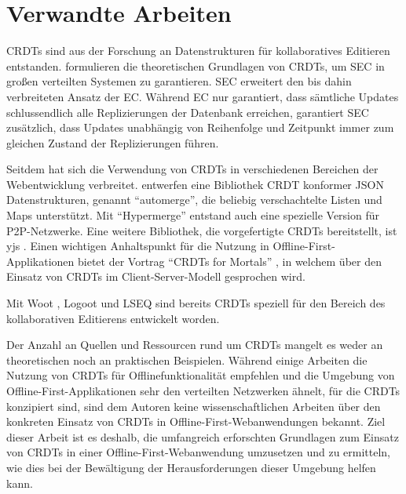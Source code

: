 \documentclass[a4paper, 12pt]{scrreprt}
\begin{document}
\section{Verwandte Arbeiten}
\label{sec:VerwandteArbeiten}

\acp{CRDT} sind aus der Forschung an Datenstrukturen für kollaboratives Editieren entstanden. \citet{InproceedingsCRDTOriginal} formulieren die theoretischen Grundlagen von \acp{CRDT}, um \ac{SEC} in großen verteilten Systemen zu garantieren. \ac{SEC} erweitert den bis dahin verbreiteten Ansatz der \ac{EC}. Während EC nur garantiert, dass sämtliche Updates schlussendlich alle Replizierungen der Datenbank erreichen, garantiert SEC zusätzlich, dass Updates unabhängig von Reihenfolge und Zeitpunkt immer zum gleichen Zustand der Replizierungen führen.

Seitdem hat sich die Verwendung von \acp{CRDT} in verschiedenen Bereichen der Webentwicklung verbreitet. \citet{ArticleCRDTJSON} entwerfen eine Bibliothek CRDT konformer \ac{JSON} Datenstrukturen, genannt \enquote{automerge}, die beliebig verschachtelte Listen und Maps unterstützt. Mit \enquote{Hypermerge} entstand auch eine spezielle Version für \ac{P2P}-Netzwerke. Eine weitere Bibliothek, die vorgefertigte \acp{CRDT} bereitstellt, ist yjs \autocite{inproceedingsYjs}. Einen wichtigen Anhaltspunkt für die Nutzung in Offline-First-Applikationen bietet der Vortrag \enquote{\acp{CRDT} for Mortals} \autocite{OnlineCrdtsForMortals}, in welchem über den Einsatz von \acp{CRDT} im Client-Server-Modell gesprochen wird.  

Mit Woot \autocite{InproceedingsCRDTWoot}, Logoot \autocite{InproceedingsCRDTLogoot} und LSEQ \autocite{InproceedingsCRDTLSEQ} sind bereits \acp{CRDT} speziell für den Bereich des kollaborativen Editierens entwickelt worden. 

Der Anzahl an Quellen und Ressourcen rund um \acp{CRDT} mangelt es weder an theoretischen noch an praktischen Beispielen. Während einige Arbeiten die Nutzung von \acp{CRDT} für Offlinefunktionalität empfehlen und die Umgebung von Offline-First-Applikationen sehr den verteilten Netzwerken ähnelt, für die \acp{CRDT} konzipiert sind, sind dem Autoren keine wissenschaftlichen Arbeiten über den konkreten Einsatz von \acp{CRDT} in Offline-First-Webanwendungen bekannt. Ziel dieser Arbeit ist es deshalb, die umfangreich erforschten Grundlagen zum Einsatz von \acp{CRDT} in einer Offline-First-Webanwendung umzusetzen und zu ermitteln, wie dies bei der Bewältigung der Herausforderungen dieser Umgebung helfen kann.
\end{document}
